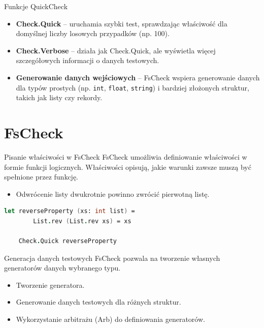     \begin{frame}{Funkcje QuickCheck}
    \begin{itemize}
        \item \textbf{Check.Quick} -- uruchamia szybki test, sprawdzając właściwość dla domyślnej liczby losowych przypadków (np. 100).
        \item \textbf{Check.Verbose} -- działa jak Check.Quick, ale wyświetla więcej szczegółowych informacji o danych testowych.
        \item \textbf{Generowanie danych wejściowych} -- FsCheck wspiera generowanie danych dla typów prostych (np. \texttt{int}, \texttt{float}, \texttt{string}) i bardziej złożonych struktur, takich jak listy czy rekordy.
    \end{itemize}
    \end{frame}
    
    \section{FsCheck}
    
    \begin{frame}[fragile]{Pisanie właściwości w FsCheck}
    FsCheck umożliwia definiowanie właściwości w formie funkcji logicznych. Właściwości opisują, jakie warunki zawsze muszą być spełnione przez funkcję.
    \begin{itemize}
        \item Odwrócenie listy dwukrotnie powinno zwrócić pierwotną listę.
    \end{itemize}
    \begin{lstlisting}[language=FSharp, xleftmargin=-10pt,xrightmargin=-10pt,numbers=none]
    let reverseProperty (xs: int list) =
        List.rev (List.rev xs) = xs

    Check.Quick reverseProperty
    \end{lstlisting}
    \end{frame}
    
    \begin{frame}{Generacja danych testowych}
    FsCheck pozwala na tworzenie własnych generatorów danych wybranego typu.
    \begin{itemize}
        \item Tworzenie generatora.
        \item Generowanie danych testowych dla różnych struktur.
        \item Wykorzystanie arbitrażu (Arb) do definiowania generatorów.
    \end{itemize}
    \end{frame}
    
